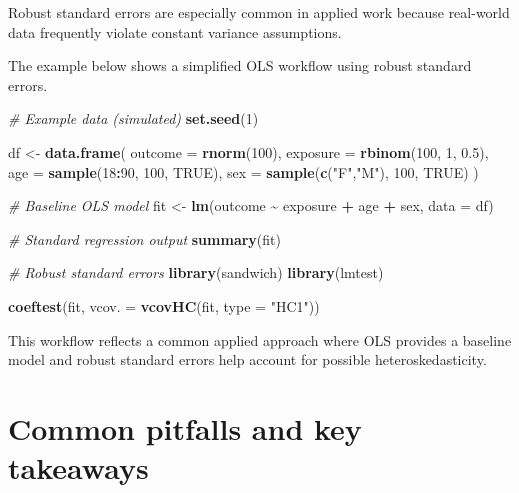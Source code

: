 \documentclass[
  11pt,
  oneside]{book}
\newenvironment{Shaded}{\begin{snugshade}}{\end{snugshade}}
\newcommand{\AttributeTok}[1]{\textcolor[rgb]{0.13,0.29,0.53}{#1}}
\newcommand{\CommentTok}[1]{\textcolor[rgb]{0.56,0.35,0.01}{\textit{#1}}}
\newcommand{\ConstantTok}[1]{\textcolor[rgb]{0.56,0.35,0.01}{#1}}
\newcommand{\DecValTok}[1]{\textcolor[rgb]{0.00,0.00,0.81}{#1}}
\newcommand{\FloatTok}[1]{\textcolor[rgb]{0.00,0.00,0.81}{#1}}
\newcommand{\FunctionTok}[1]{\textcolor[rgb]{0.13,0.29,0.53}{\textbf{#1}}}
\newcommand{\NormalTok}[1]{#1}
\newcommand{\OtherTok}[1]{\textcolor[rgb]{0.56,0.35,0.01}{#1}}
\newcommand{\SpecialCharTok}[1]{\textcolor[rgb]{0.81,0.36,0.00}{\textbf{#1}}}
\newcommand{\StringTok}[1]{\textcolor[rgb]{0.31,0.60,0.02}{#1}}
\begin{document}
Robust standard errors are especially common in applied work because real-world data frequently violate constant variance assumptions.

The example below shows a simplified OLS workflow using robust standard errors.

\begin{Shaded}
\begin{Highlighting}[]
\CommentTok{\# Example data (simulated)}
\FunctionTok{set.seed}\NormalTok{(}\DecValTok{1}\NormalTok{)}

\NormalTok{df }\OtherTok{\textless{}{-}} \FunctionTok{data.frame}\NormalTok{(}
  \AttributeTok{outcome =} \FunctionTok{rnorm}\NormalTok{(}\DecValTok{100}\NormalTok{),}
  \AttributeTok{exposure =} \FunctionTok{rbinom}\NormalTok{(}\DecValTok{100}\NormalTok{, }\DecValTok{1}\NormalTok{, }\FloatTok{0.5}\NormalTok{),}
  \AttributeTok{age =} \FunctionTok{sample}\NormalTok{(}\DecValTok{18}\SpecialCharTok{:}\DecValTok{90}\NormalTok{, }\DecValTok{100}\NormalTok{, }\ConstantTok{TRUE}\NormalTok{),}
  \AttributeTok{sex =} \FunctionTok{sample}\NormalTok{(}\FunctionTok{c}\NormalTok{(}\StringTok{"F"}\NormalTok{,}\StringTok{"M"}\NormalTok{), }\DecValTok{100}\NormalTok{, }\ConstantTok{TRUE}\NormalTok{)}
\NormalTok{)}

\CommentTok{\# Baseline OLS model}
\NormalTok{fit }\OtherTok{\textless{}{-}} \FunctionTok{lm}\NormalTok{(outcome }\SpecialCharTok{\textasciitilde{}}\NormalTok{ exposure }\SpecialCharTok{+}\NormalTok{ age }\SpecialCharTok{+}\NormalTok{ sex, }\AttributeTok{data =}\NormalTok{ df)}

\CommentTok{\# Standard regression output}
\FunctionTok{summary}\NormalTok{(fit)}

\CommentTok{\# Robust standard errors}
\FunctionTok{library}\NormalTok{(sandwich)}
\FunctionTok{library}\NormalTok{(lmtest)}

\FunctionTok{coeftest}\NormalTok{(fit, }\AttributeTok{vcov. =} \FunctionTok{vcovHC}\NormalTok{(fit, }\AttributeTok{type =} \StringTok{"HC1"}\NormalTok{))}
\end{Highlighting}
\end{Shaded}

This workflow reflects a common applied approach where OLS provides a baseline model and robust standard errors help account for possible heteroskedasticity.

\section{Common pitfalls and key takeaways}\label{common-pitfalls-and-key-takeaways-3}
\end{document}
